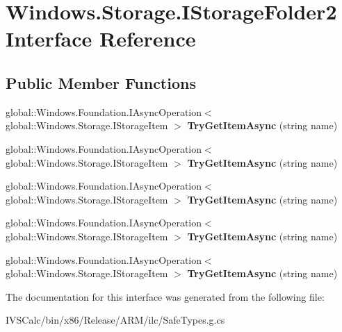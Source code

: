\hypertarget{interface_windows_1_1_storage_1_1_i_storage_folder2}{}\section{Windows.\+Storage.\+I\+Storage\+Folder2 Interface Reference}
\label{interface_windows_1_1_storage_1_1_i_storage_folder2}
\subsection*{Public Member Functions}
\begin{DoxyCompactItemize}
\item 
\mbox{\label{interface_windows_1_1_storage_1_1_i_storage_folder2_ad2f73fc59b542ba554977c0e9e8ff9f4}} 
global\+::\+Windows.\+Foundation.\+I\+Async\+Operation$<$ global\+::\+Windows.\+Storage.\+I\+Storage\+Item $>$ {\bfseries Try\+Get\+Item\+Async} (string name)
\item 
\mbox{\label{interface_windows_1_1_storage_1_1_i_storage_folder2_ad2f73fc59b542ba554977c0e9e8ff9f4}} 
global\+::\+Windows.\+Foundation.\+I\+Async\+Operation$<$ global\+::\+Windows.\+Storage.\+I\+Storage\+Item $>$ {\bfseries Try\+Get\+Item\+Async} (string name)
\item 
\mbox{\label{interface_windows_1_1_storage_1_1_i_storage_folder2_ad2f73fc59b542ba554977c0e9e8ff9f4}} 
global\+::\+Windows.\+Foundation.\+I\+Async\+Operation$<$ global\+::\+Windows.\+Storage.\+I\+Storage\+Item $>$ {\bfseries Try\+Get\+Item\+Async} (string name)
\item 
\mbox{\label{interface_windows_1_1_storage_1_1_i_storage_folder2_ad2f73fc59b542ba554977c0e9e8ff9f4}} 
global\+::\+Windows.\+Foundation.\+I\+Async\+Operation$<$ global\+::\+Windows.\+Storage.\+I\+Storage\+Item $>$ {\bfseries Try\+Get\+Item\+Async} (string name)
\item 
\mbox{\label{interface_windows_1_1_storage_1_1_i_storage_folder2_ad2f73fc59b542ba554977c0e9e8ff9f4}} 
global\+::\+Windows.\+Foundation.\+I\+Async\+Operation$<$ global\+::\+Windows.\+Storage.\+I\+Storage\+Item $>$ {\bfseries Try\+Get\+Item\+Async} (string name)
\end{DoxyCompactItemize}


The documentation for this interface was generated from the following file\+:\begin{DoxyCompactItemize}
\item 
I\+V\+S\+Calc/bin/x86/\+Release/\+A\+R\+M/ilc/Safe\+Types.\+g.\+cs\end{DoxyCompactItemize}
